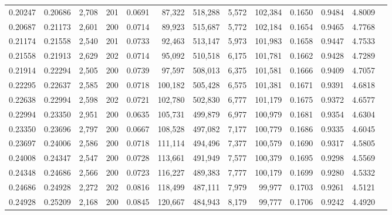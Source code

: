 \begin{tabular}{rrrrrrrrrrrrr}
0.20247 & 0.20686 & 2,708 & 201 &                                     0.0691 &  87,322 & 518,288 &   5,572 & 102,384 & 0.1650 & 0.9484 & 4.8009 \\
0.20687 & 0.21173 & 2,601 & 200 &                                     0.0714 &  89,923 & 515,687 &   5,772 & 102,184 & 0.1654 & 0.9465 & 4.7768 \\
0.21174 & 0.21558 & 2,540 & 201 &                                     0.0733 &  92,463 & 513,147 &   5,973 & 101,983 & 0.1658 & 0.9447 & 4.7533 \\
0.21558 & 0.21913 & 2,629 & 202 &                                     0.0714 &  95,092 & 510,518 &   6,175 & 101,781 & 0.1662 & 0.9428 & 4.7289 \\
0.21914 & 0.22294 & 2,505 & 200 &                                     0.0739 &  97,597 & 508,013 &   6,375 & 101,581 & 0.1666 & 0.9409 & 4.7057 \\
0.22295 & 0.22637 & 2,585 & 200 &                                     0.0718 & 100,182 & 505,428 &   6,575 & 101,381 & 0.1671 & 0.9391 & 4.6818 \\
0.22638 & 0.22994 & 2,598 & 202 &                                     0.0721 & 102,780 & 502,830 &   6,777 & 101,179 & 0.1675 & 0.9372 & 4.6577 \\
0.22994 & 0.23350 & 2,951 & 200 &                                     0.0635 & 105,731 & 499,879 &   6,977 & 100,979 & 0.1681 & 0.9354 & 4.6304 \\
0.23350 & 0.23696 & 2,797 & 200 &                                     0.0667 & 108,528 & 497,082 &   7,177 & 100,779 & 0.1686 & 0.9335 & 4.6045 \\
0.23697 & 0.24006 & 2,586 & 200 &                                     0.0718 & 111,114 & 494,496 &   7,377 & 100,579 & 0.1690 & 0.9317 & 4.5805 \\
0.24008 & 0.24347 & 2,547 & 200 &                                     0.0728 & 113,661 & 491,949 &   7,577 & 100,379 & 0.1695 & 0.9298 & 4.5569 \\
0.24348 & 0.24686 & 2,566 & 200 &                                     0.0723 & 116,227 & 489,383 &   7,777 & 100,179 & 0.1699 & 0.9280 & 4.5332 \\
0.24686 & 0.24928 & 2,272 & 202 &                                     0.0816 & 118,499 & 487,111 &   7,979 &  99,977 & 0.1703 & 0.9261 & 4.5121 \\
0.24928 & 0.25209 & 2,168 & 200 &                                     0.0845 & 120,667 & 484,943 &   8,179 &  99,777 & 0.1706 & 0.9242 & 4.4920 \\

\end{tabular}
